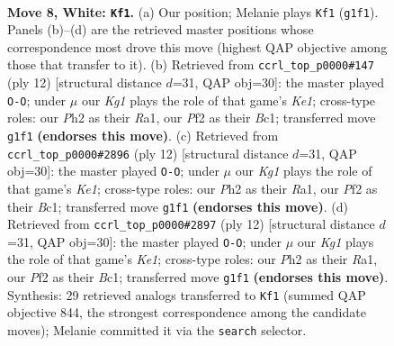 \documentclass[11pt]{article}
\begin{document}
\begin{figure}[p]\centering
\begin{subfigure}{0.46\textwidth}\centering
\resizebox{\linewidth}{!}{%
\newchessgame
\chessboard[
  setfen={rnbq1rk1/pp2ppb1/2pp1np1/7p/3PP3/2N2N2/PPP1BPPP/R1BQR1K1 w - - 0 8},
  showmover=false,
  pgfstyle=straightmove, color=movearrow, markmove={g1-f1}
]}
\caption{}
\end{subfigure}\hfill
\begin{subfigure}{0.46\textwidth}\centering
\resizebox{\linewidth}{!}{%
\newchessgame
\chessboard[
  setfen={rnbq1rk1/pp2ppbp/2pp1np1/8/2PPP3/2N2N2/PP2BPPP/R1BQK2R w KQ - 0 7},
  showmover=false,
  pgfstyle=straightmove, color=movearrow, markmove={e1-g1}
]}
\caption{}
\end{subfigure}
\\[4pt]
\begin{subfigure}{0.46\textwidth}\centering
\resizebox{\linewidth}{!}{%
\newchessgame
\chessboard[
  setfen={rnbq1rk1/pp2ppbp/2pp1np1/8/2PPP3/2N2N2/PP2BPPP/R1BQK2R w KQ - 4 7},
  showmover=false,
  pgfstyle=straightmove, color=movearrow, markmove={e1-g1}
]}
\caption{}
\end{subfigure}\hfill
\begin{subfigure}{0.46\textwidth}\centering
\resizebox{\linewidth}{!}{%
\newchessgame
\chessboard[
  setfen={rnbq1rk1/pp2ppbp/2pp1np1/8/2PPP3/2N2N2/PP2BPPP/R1BQK2R w KQ - 4 7},
  showmover=false,
  pgfstyle=straightmove, color=movearrow, markmove={e1-g1}
]}
\caption{}
\end{subfigure}
\caption{\textbf{Move 8, White: \texttt{Kf1}.} (a) Our position; Melanie plays \texttt{Kf1} (\texttt{g1f1}). Panels (b)--(d) are the retrieved master positions whose correspondence most drove this move (highest QAP objective among those that transfer to it). (b) Retrieved from \texttt{ccrl\_top\_p0000\#147} (ply 12) [structural distance $d$=31, QAP obj=30]: the master played \texttt{O-O}; under $\mu$ our \emph{Kg1} plays the role of that game's \emph{Ke1}; cross-type roles: our \emph{P}h2 as their \emph{R}a1, our \emph{P}f2 as their \emph{B}c1; transferred move \texttt{g1f1} \textbf{(endorses this move)}. (c) Retrieved from \texttt{ccrl\_top\_p0000\#2896} (ply 12) [structural distance $d$=31, QAP obj=30]: the master played \texttt{O-O}; under $\mu$ our \emph{Kg1} plays the role of that game's \emph{Ke1}; cross-type roles: our \emph{P}h2 as their \emph{R}a1, our \emph{P}f2 as their \emph{B}c1; transferred move \texttt{g1f1} \textbf{(endorses this move)}. (d) Retrieved from \texttt{ccrl\_top\_p0000\#2897} (ply 12) [structural distance $d$=31, QAP obj=30]: the master played \texttt{O-O}; under $\mu$ our \emph{Kg1} plays the role of that game's \emph{Ke1}; cross-type roles: our \emph{P}h2 as their \emph{R}a1, our \emph{P}f2 as their \emph{B}c1; transferred move \texttt{g1f1} \textbf{(endorses this move)}. Synthesis: 29 retrieved analogs transferred to \texttt{Kf1} (summed QAP objective 844, the strongest correspondence among the candidate moves); Melanie committed it via the \texttt{search} selector.}
\label{fig:thought-m14}
\end{figure}
\end{document}
